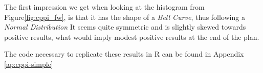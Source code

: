 The first impression we get when looking at the histogram from Figure\ref{fig:cppi_fw}, is that it has the shape of a \textit{Bell Curve}, thus following a \textit{Normal Distribution} It seems quite symmetric and is slightly skewed towards positive results, what would imply modest positive results at the end of the plan.


The code necessary to replicate these results in R can be found in Appendix \ref{ap:cppi-simple}
